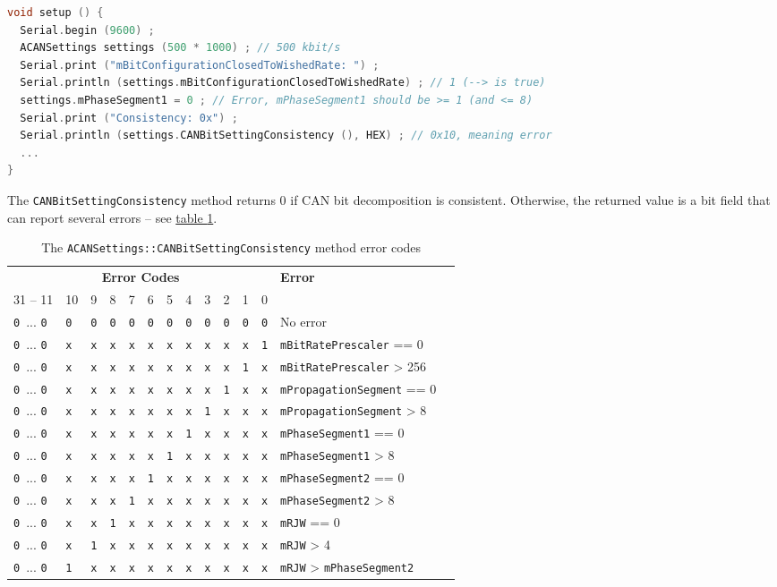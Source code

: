 \documentclass[9pt, a4paper, obeyspaces, openany]{extarticle}
\newcommand\labelTableau[1]{\label{tab:#1}}
\newcommand\refTableau[1]{\hyperref[tab:#1]{table \ref*{tab:#1}}}
\begin{document}
{ \small\begin{lstlisting}[language=c++]
void setup () {
  Serial.begin (9600) ;
  ACANSettings settings (500 * 1000) ; // 500 kbit/s
  Serial.print ("mBitConfigurationClosedToWishedRate: ") ;
  Serial.println (settings.mBitConfigurationClosedToWishedRate) ; // 1 (--> is true)
  settings.mPhaseSegment1 = 0 ; // Error, mPhaseSegment1 should be >= 1 (and <= 8)
  Serial.print ("Consistency: 0x") ;
  Serial.println (settings.CANBitSettingConsistency (), HEX) ; // 0x10, meaning error
  ...
}
\end{lstlisting}}

The \texttt{CANBitSettingConsistency} method returns $0$ if CAN bit decomposition is consistent. Otherwise, the returned value is a bit field that can report several errors -- see \refTableau{CANBitSettingConsistencyErrorCode}.

\begin{table}[htbp]
  \newcommand\zero{\texttt{0}}
  \newcommand\X{\texttt{x}}
  \small
  \onehalfspacing
  \centering
  \begin{tabular}{llllllllllllll}
    \multicolumn{12}{c}{\textbf{Error Codes}} & \textbf{Error}\\
    31 -- 11 & 10 & 9 & 8 & 7 & 6 & 5 & 4 & 3 & 2 & 1 & 0 & \\
    \zero~...  \zero &\zero &\zero &\zero &\zero &\zero &\zero &\zero &\zero &\zero &\zero &\zero & No error \\
    \zero~...  \zero &\X &\X &\X &\X &\X &\X &\X &\X &\X &\X &\texttt{1} & \texttt{mBitRatePrescaler} == 0\\
    \zero~...  \zero &\X &\X &\X &\X &\X &\X &\X &\X &\X &\texttt{1}&\X & \texttt{mBitRatePrescaler} > 256\\
    \zero~...  \zero &\X &\X &\X &\X &\X &\X &\X &\X &\texttt{1}&\X &\X & \texttt{mPropagationSegment} == 0\\
    \zero~...  \zero &\X &\X &\X &\X &\X &\X &\X &\texttt{1}&\X &\X &\X & \texttt{mPropagationSegment} > 8\\
    \zero~...  \zero &\X &\X &\X &\X &\X &\X &\texttt{1}&\X &\X &\X &\X & \texttt{mPhaseSegment1} == 0\\
    \zero~...  \zero &\X &\X &\X &\X &\X &\texttt{1}&\X &\X &\X &\X &\X & \texttt{mPhaseSegment1} > 8\\
    \zero~...  \zero &\X &\X &\X &\X &\texttt{1}&\X &\X &\X &\X &\X &\X & \texttt{mPhaseSegment2} == 0\\
    \zero~...  \zero &\X &\X &\X &\texttt{1}&\X &\X &\X &\X &\X &\X &\X & \texttt{mPhaseSegment2} > 8\\
    \zero~...  \zero &\X &\X &\texttt{1}&\X &\X &\X &\X &\X &\X &\X &\X & \texttt{mRJW} == 0\\
    \zero~...  \zero &\X &\texttt{1}&\X &\X &\X &\X &\X &\X &\X &\X &\X & \texttt{mRJW} > 4\\
    \zero~...  \zero &\texttt{1}&\X &\X &\X &\X &\X &\X &\X &\X &\X &\X & \texttt{mRJW} > \texttt{mPhaseSegment2}\\
  \end{tabular}
  \caption{The \texttt{ACANSettings::CANBitSettingConsistency} method error codes}
  \labelTableau{CANBitSettingConsistencyErrorCode}
\end{table}
\end{document}
